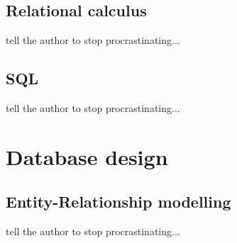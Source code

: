 \documentclass[10pt,a4paper]{article}
\begin{document}
	\subsection{Relational calculus}
	tell the author to stop procrastinating...	
	\subsection{SQL}
	tell the author to stop procrastinating...

\section{Database design}
	\subsection{Entity-Relationship modelling}
	tell the author to stop procrastinating...
\end{document}
